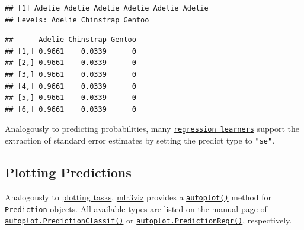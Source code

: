 \documentclass[
]{scrbook}
\newenvironment{Shaded}{\begin{snugshade}}{\end{snugshade}}
\newcommand{\CommentTok}[1]{\textcolor[rgb]{0.56,0.35,0.01}{\textit{#1}}}
\newcommand{\FunctionTok}[1]{\textcolor[rgb]{0.00,0.00,0.00}{#1}}
\newcommand{\NormalTok}[1]{#1}
\newcommand{\SpecialCharTok}[1]{\textcolor[rgb]{0.00,0.00,0.00}{#1}}
\renewenvironment{Shaded} {\begin{snugshade}\small} {\end{snugshade}}
\begin{document}
\begin{Shaded}
\end{Shaded}

\begin{verbatim}
## [1] Adelie Adelie Adelie Adelie Adelie Adelie
## Levels: Adelie Chinstrap Gentoo
\end{verbatim}

\begin{Shaded}
\end{Shaded}

\begin{verbatim}
##      Adelie Chinstrap Gentoo
## [1,] 0.9661    0.0339      0
## [2,] 0.9661    0.0339      0
## [3,] 0.9661    0.0339      0
## [4,] 0.9661    0.0339      0
## [5,] 0.9661    0.0339      0
## [6,] 0.9661    0.0339      0
\end{verbatim}

Analogously to predicting probabilities, many \href{https://mlr3.mlr-org.com/reference/LearnerRegr.html}{\texttt{regression\ learners}} support the extraction of standard error estimates by setting the predict type to \texttt{"se"}.

\hypertarget{autoplot-prediction}{%
\subsection{Plotting Predictions}\label{autoplot-prediction}}

Analogously to \protect\hyperlink{autoplot-task}{plotting tasks}, \href{https://mlr3viz.mlr-org.com}{mlr3viz} provides a \href{https://www.rdocumentation.org/packages/ggplot2/topics/autoplot}{\texttt{autoplot()}} method for \href{https://mlr3.mlr-org.com/reference/Prediction.html}{\texttt{Prediction}} objects.
All available types are listed on the manual page of \href{https://mlr3viz.mlr-org.com/reference/autoplot.PredictionClassif.html}{\texttt{autoplot.PredictionClassif()}} or \href{https://mlr3viz.mlr-org.com/reference/autoplot.PredictionRegr.html}{\texttt{autoplot.PredictionRegr()}}, respectively.
\end{document}
